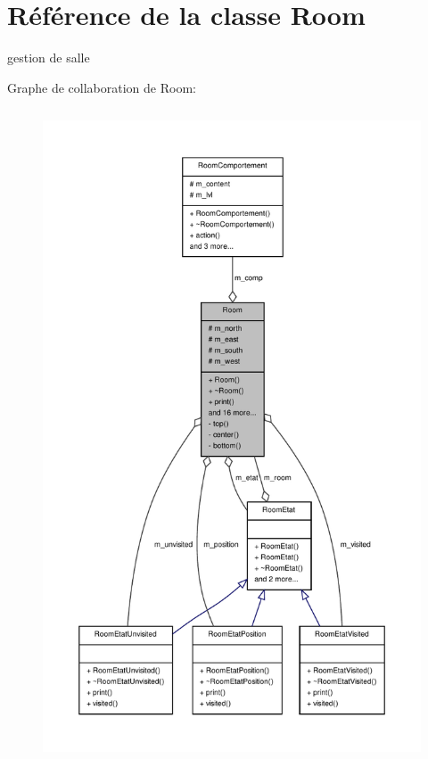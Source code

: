 \hypertarget{class_room}{\section{Référence de la classe Room}
\label{class_room}
}


gestion de salle  




Graphe de collaboration de Room\-:
\nopagebreak
\begin{figure}[H]
\begin{center}
\leavevmode
\includegraphics[height=550pt]{class_room__coll__graph}
\end{center}
\end{figure}

